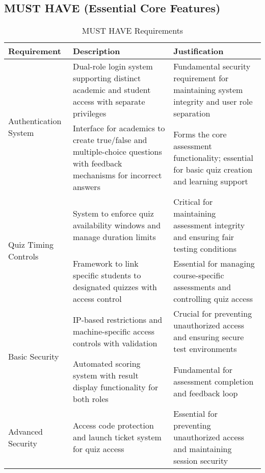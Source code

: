 \subsection{MUST HAVE (Essential Core Features)}
\begin{table}[h!]
\centering
\begin{tabular}{|p{3.5cm}|p{4cm}|p{6.5cm}|}
\hline
\textbf{Requirement} & \textbf{Description} & \textbf{Justification} \\
\hline
\multirow{2}{*}{Authentication System} & Dual-role login system supporting distinct academic and student access with separate privileges & Fundamental security requirement for maintaining system integrity and user role separation \\
\cline{2-3}
\multirow{2}{*}{Question Management} & Interface for academics to create true/false and multiple-choice questions with feedback mechanisms for incorrect answers & Forms the core assessment functionality; essential for basic quiz creation and learning support \\
\cline{2-3}
\multirow{2}{*}{Quiz Timing Controls} & System to enforce quiz availability windows and manage duration limits & Critical for maintaining assessment integrity and ensuring fair testing conditions \\
\cline{2-3}
\multirow{2}{*}{Student Assignment} & Framework to link specific students to designated quizzes with access control & Essential for managing course-specific assessments and controlling quiz access \\
\cline{2-3}
\multirow{2}{*}{Basic Security} & IP-based restrictions and machine-specific access controls with validation & Crucial for preventing unauthorized access and ensuring secure test environments \\
\cline{2-3}
\multirow{2}{*}{Result Management} & Automated scoring system with result display functionality for both roles & Fundamental for assessment completion and feedback loop \\
\cline{2-3}
\multirow{2}{*}{Advanced Security} & Access code protection and launch ticket system for quiz access & Essential for preventing unauthorized access and maintaining session security \\
\hline
\end{tabular}
\caption{MUST HAVE Requirements}
\label{tab:must-have}
\end{table}

